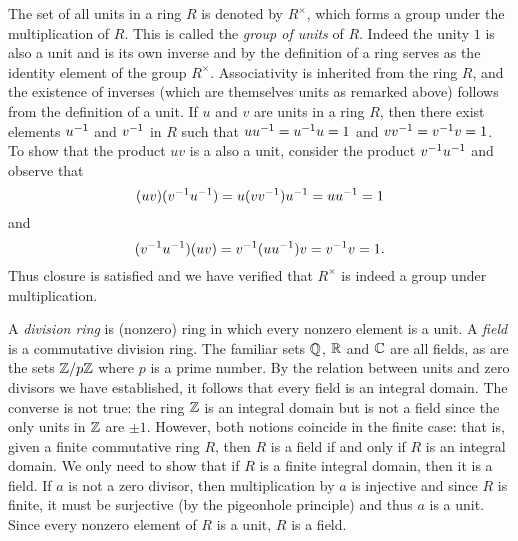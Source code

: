 \begin{example}
    The set of all units in a ring \(R\) is denoted by \(R^\times\), which forms
    a group under the multiplication of \(R\). This is called the \emph{group of
    units} of \(R\). Indeed the unity \(1\) is also a unit and is its own
    inverse and by the definition of a ring serves as the identity element of
    the group \(R^\times\). Associativity is inherited from the ring \(R\), and
    the existence of inverses (which are themselves units as remarked above)
    follows from the definition of a unit. If \(u\) and \(v\) are units in a
    ring \(R\), then there exist elements \(u^{-1}\) and \(v^{-1}\) in \(R\) such
    that \(uu^{-1} = u^{-1} u = 1\) and \(vv^{-1} = v^{-1} v = 1\). To show that the
    product \(uv\) is a also a unit, consider the product \(v^{-1} u^{-1}\) and
    observe that
    \[
        (uv)(v^{-1} u^{-1}) = u(vv^{-1})u^{-1} =  uu^{-1} = 1
    \]
    and
    \[
        (v^{-1} u^{-1})(uv) = v^{-1}(uu^{-1})v = v^{-1} v = 1.
    \]
    Thus closure is satisfied and we have verified that \(R^\times\) is indeed a
    group under multiplication.

    A \emph{division ring} is  (nonzero) ring in which every nonzero element is
    a unit. A \emph{field} is a commutative division ring. The familiar sets
    \(\mathbb{Q}\), \(\mathbb{R}\) and \(\mathbb{C}\) are all fields, as are the sets \(\mathbb{Z}/p\mathbb{Z}\) where
    \(p\) is a prime number.  By the relation between units and zero divisors we
    have established, it follows that every field is an integral domain. The
    converse is not true: the ring \(\mathbb{Z}\) is an integral domain but is not a
    field since the only units in \(\mathbb{Z}\) are \(\pm 1\). However, both notions
    coincide in the finite case: that is, given a finite commutative ring \(R\),
    then \(R\) is a field if and only if \(R\) is an integral domain. We only
    need to show that if \(R\) is a finite integral domain, then it is a field.
    If \(a\) is not a zero divisor, then multiplication by \(a\) is injective
    and since \(R\) is finite, it must be surjective (by the pigeonhole
    principle) and thus \(a\) is a unit. Since every nonzero element of \(R\) is
    a unit, \(R\) is a field.
\end{example}

